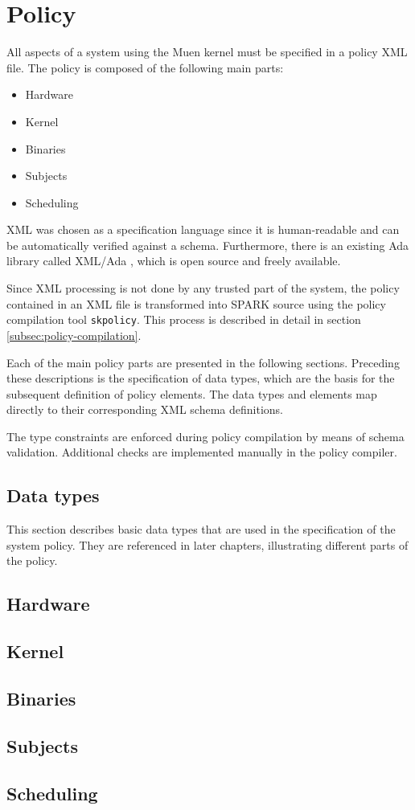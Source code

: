 \section{Policy}\label{sec:policy}
All aspects of a system using the Muen kernel must be specified in a policy XML
file. The policy is composed of the following main parts:

\begin{itemize}
	\item Hardware
	\item Kernel
	\item Binaries
	\item Subjects
	\item Scheduling
\end{itemize}

XML was chosen as a specification language since it is human-readable and can
be automatically verified against a schema. Furthermore, there is an existing
Ada library called XML/Ada \cite{xmlada}, which is open source and freely
available.

Since XML processing is not done by any trusted part of the system, the policy
contained in an XML file is transformed into SPARK source using the policy
compilation tool \texttt{skpolicy}. This process is described in detail in
section \ref{subsec:policy-compilation}.

Each of the main policy parts are presented in the following sections. Preceding
these descriptions is the specification of data types, which are the basis for
the subsequent definition of policy elements. The data types and elements map
directly to their corresponding XML schema definitions.

The type constraints are enforced during policy compilation by means of schema
validation. Additional checks are implemented manually in the policy compiler.

\subsection{Data types}
This section describes basic data types that are used in the specification of
the system policy. They are referenced in later chapters, illustrating different
parts of the policy.



\subsection{Hardware}
\label{subsec:hardware}


\subsection{Kernel}


\subsection{Binaries}


\subsection{Subjects}\label{subsec:subjects}


\subsection{Scheduling}

